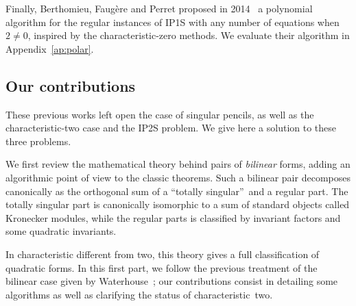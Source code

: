 \documentclass{lms}
\begin{document}
Finally, Berthomieu, Faugère and Perret
proposed in 2014~\cite{DBLP:journals/corr/BerthomieuFP13}
a polynomial algorithm for the regular instances of IP1S
with any number of equations when~$2 ≠ 0$,
inspired by the characteristic-zero methods.
We evaluate their algorithm in Appendix~\ref{ap:polar}.



\subsection*{Our contributions}

These previous works left open the case of singular pencils,
as well as the characteristic-two case
and the IP2S problem.
We give here a solution to these three problems.

We first review the mathematical theory behind pairs of \emph{bilinear} forms,
adding an algorithmic point of view to the classic theorems.
% 
Such a bilinear pair decomposes canonically as the orthogonal sum of
a “totally singular” and a regular part.
The totally singular part is canonically isomorphic to a sum of
standard objects called Kronecker modules,
while the regular parts is classified by invariant factors
and some quadratic invariants.

In characteristic different from two,
this theory gives a full classification of quadratic forms.
In this first part, we follow the previous treatment of
the bilinear case given by Waterhouse~\cite{inventiones1976waterhouse};
our contributions consist in detailing some algorithms
as well as clarifying the status of characteristic~two.
\end{document}
